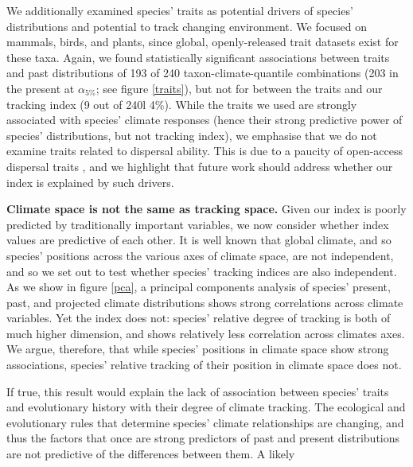 \documentclass[12pt]{report}
\begin{document}
We additionally examined species' traits as potential drivers of
species' distributions and potential to track changing environment. We
focused on mammals\supercite{Jones2009a,Wilman2014},
birds\supercite{Wilman2014}, and plants\supercite{Wright2004}, since
global, openly-released trait datasets exist for these taxa. Again, we
found statistically significant associations between traits and past
distributions of 193 of 240 taxon-climate-quantile combinations (203
in the present at $\alpha_{5\%}$; see figure \ref{traits}), but not
for between the traits and our tracking index (9 out of 240l
4\%). While the traits we used are strongly associated with species'
climate responses\supercite{Wright2004} (hence their strong predictive
power of species' distributions, but not tracking index), we emphasise
that we do not examine traits related to dispersal ability. This is
due to a paucity of open-access dispersal traits
\supercite{Gallagher2019}, and we highlight that future work should
address whether our index is explained by such drivers.

\textbf{Climate space is not the same as tracking space.} Given our
index is poorly predicted by traditionally important variables, we now
consider whether index values are predictive of each other. It is well
known that global climate\supercite{xxx}, and so species' positions
across the various axes of climate space\supercite{xxx}, are not
independent, and so we set out to test whether species' tracking
indices are also independent. As we show in figure \ref{pca}, a
principal components analysis of species' present, past, and projected
climate distributions shows strong correlations across climate
variables. Yet the index does not: species' relative degree of
tracking is both of much higher dimension, and shows relatively less
correlation across climates axes. We argue, therefore, that while
species' positions in climate space show strong associations, species'
relative tracking of their position in climate space does not.

If true, this result would explain the lack of association between
species' traits and evolutionary history with their degree of climate
tracking. The ecological and evolutionary rules that determine
species' climate relationships are changing, and thus the factors that
once are strong predictors of past and present distributions are not
predictive of the differences between them. A likely 
\end{document}
